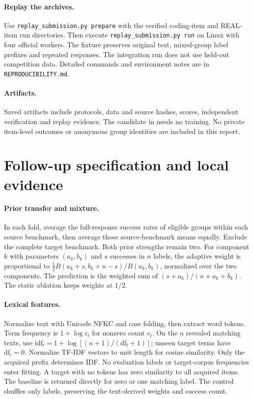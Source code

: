 \documentclass{article}
\begin{document}
\paragraph{Replay the archives.}
Use \texttt{replay\_submission.py prepare} with the verified coding-item and
REAL-item run directories. Then execute \texttt{replay\_submission.py run}
on Linux with four official workers. The fixture preserves original text,
mixed-group label prefixes and repeated responses. The integration run
does not use held-out competition data. Detailed commands and environment
notes are in \texttt{REPRODUCIBILITY.md}.

\paragraph{Artifacts.}
Saved artifacts include protocols, data and source hashes, scores,
independent verification and replay evidence. The candidate in
 needs no training. No private item-level outcomes
or anonymous group identities are included in this report.
\clearpage
\section{Follow-up specification and local evidence}
\paragraph{Prior transfer and mixture.}
In each fold, average the full-response success rates of eligible groups within
each source benchmark, then average those source-benchmark means equally.
Exclude the complete target benchmark. Both prior strengths remain two.
For component $k$ with parameters $(a_k,b_k)$ and $s$ successes in $n$ labels,
the adaptive weight is proportional to
$\tfrac12 B(a_k+s,b_k+n-s)/B(a_k,b_k)$, normalized over the two components.
The prediction is the weighted sum of $(s+a_k)/(n+a_k+b_k)$.
The static ablation keeps weights at $1/2$.

\paragraph{Lexical features.}
Normalize text with Unicode NFKC and case folding, then extract word tokens.
Term frequency is $1+\log c_t$ for nonzero count $c_t$.
On the $n$ revealed matching texts, use
$\mathrm{idf}_t=1+\log[(n+1)/(\mathrm{df}_t+1)]$; unseen target terms have
$\mathrm{df}_t=0$. Normalize TF-IDF vectors to unit length for cosine similarity.
Only the acquired prefix determines IDF. No evaluation labels or target-corpus
frequencies enter fitting. A target with no tokens has zero similarity to all
acquired items. The baseline is returned directly for zero or one matching label.
The control shuffles only labels, preserving the text-derived weights and success count.
\end{document}
